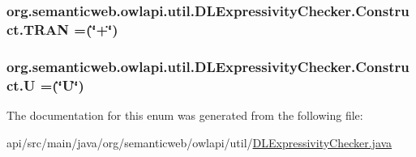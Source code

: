\hypertarget{enumorg_1_1semanticweb_1_1owlapi_1_1util_1_1_d_l_expressivity_checker_1_1_construct_ade701337b065414f2a765f417c15c401}{
\subsubsection[{T\-R\-A\-N}]{\setlength{\rightskip}{0pt plus 5cm}org.\-semanticweb.\-owlapi.\-util.\-D\-L\-Expressivity\-Checker.\-Construct.\-T\-R\-A\-N =(\char`\"{}+\char`\"{})}}\label{enumorg_1_1semanticweb_1_1owlapi_1_1util_1_1_d_l_expressivity_checker_1_1_construct_ade701337b065414f2a765f417c15c401}
\hypertarget{enumorg_1_1semanticweb_1_1owlapi_1_1util_1_1_d_l_expressivity_checker_1_1_construct_ae76be3f53d4ae7c05762de2a1dd5e01b}{
\subsubsection[{U}]{\setlength{\rightskip}{0pt plus 5cm}org.\-semanticweb.\-owlapi.\-util.\-D\-L\-Expressivity\-Checker.\-Construct.\-U =(\char`\"{}U\char`\"{})}}\label{enumorg_1_1semanticweb_1_1owlapi_1_1util_1_1_d_l_expressivity_checker_1_1_construct_ae76be3f53d4ae7c05762de2a1dd5e01b}


The documentation for this enum was generated from the following file\-:\begin{DoxyCompactItemize}
\item 
api/src/main/java/org/semanticweb/owlapi/util/\hyperlink{_d_l_expressivity_checker_8java}{D\-L\-Expressivity\-Checker.\-java}\end{DoxyCompactItemize}
